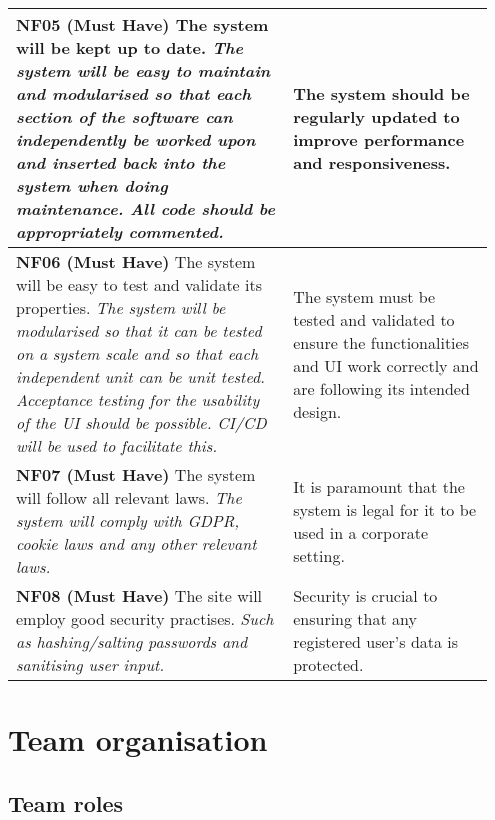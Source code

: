 \documentclass[10pt]{article}
\begin{document}
\begin{longtable}{|p{0.55\linewidth}|p{0.4\linewidth}|}
    \textbf{NF05 (Must Have) }
    The system will be kept up to date.
    \textit{The system will be easy to maintain and modularised so that each        %
    section of the software can independently be worked upon and inserted back
    into the system when doing maintenance. All code should be appropriately
    commented.}
        &
    The system should be regularly updated to improve performance and
    responsiveness.
    \\ \hline

    \textbf{NF06 (Must Have) }
    The system will be easy to test and validate its properties.
    \textit{The system will be modularised so that it can be tested on a system
    scale and so that each independent unit can be unit tested. Acceptance
    testing for the usability of the UI should be possible. CI/CD will be used
    to facilitate this.}
        &
    The system must be tested and validated to ensure the functionalities and UI
    work correctly and are following its intended design.
    \\ \hline

    \textbf{NF07 (Must Have) }
    The system will follow all relevant laws.
    \textit{The system will comply with GDPR, cookie laws and any other relevant
    laws.}
        &
    It is paramount that the system is legal for it to be used in a corporate
    setting.
    \\ \hline

    \textbf{NF08 (Must Have) }
    The site will employ good security practises.
    \textit{Such as hashing/salting passwords and sanitising user input.}
        &
    Security is crucial to ensuring that any registered user's data is protected.
    \\ \hline

\end{longtable}

\vspace{-4mm}\section{Team organisation}\vspace{-2mm}
\subsection{Team roles}\vspace{-2mm}
\end{document}
